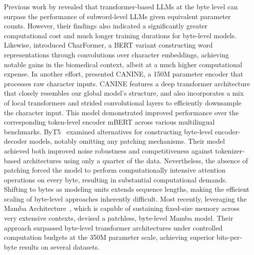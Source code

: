 Previous work by \cite{Choe2019BridgingTG} revealed that transformer-based LLMs at the byte level can surpass the performance of subword-level LLMs given equivalent parameter counts. However, their findings also indicated a significantly greater computational cost and much longer training durations for byte-level models. Likewise, \cite{el2020characterbert} introduced CharFormer, a BERT variant constructing word representations through convolutions over character embeddings, achieving notable gains in the biomedical context, albeit at a much higher computational expense. In another effort, \cite{clark2022canine} presented CANINE, a 150M parameter encoder that processes raw character inputs. CANINE features a deep transformer architecture that closely resembles our global model’s structure, and also incorporates a mix of local transformers and strided convolutional layers to efficiently downsample the character input. This model demonstrated improved performance over the corresponding token-level encoder mBERT across various multilingual benchmarks. ByT5~\citep{xue2022byt5} examined alternatives for constructing byte-level encoder-decoder models, notably omitting any patching mechanisms. Their model achieved both improved noise robustness and competitiveness against tokenizer-based architectures using only a quarter of the data. Nevertheless, the absence of patching forced the model to perform computationally intensive attention operations on every byte, resulting in substantial computational demands. Shifting to bytes as modeling units extends sequence lengths, making the efficient scaling of byte-level approaches inherently difficult. Most recently, leveraging the Mamba Architecture~\citep{gu2023mamba}, which is capable of sustaining fixed-size memory across very extensive contexts, \cite{wang2024mambabyte} devised a patchless, byte-level Mamba model. Their approach surpassed byte-level transformer architectures under controlled computation budgets at the 350M parameter scale, achieving superior bits-per-byte results on several datasets.

